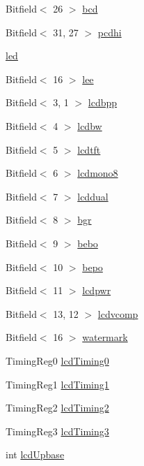 \begin{DoxyCompactItemize}
\item 
Bitfield$<$ 26 $>$ \hyperlink{classPl111_a0187bf822dcc45b134574fc55eed6eb1}{bcd}
\item 
Bitfield$<$ 31, 27 $>$ \hyperlink{classPl111_a2c2dac95ed9aeb35e4a37ebdafc357e2}{pcdhi}
\item 
\hyperlink{classPl111_a9109701c3de11ac33b79bf6ff097c638}{led}
\item 
Bitfield$<$ 16 $>$ \hyperlink{classPl111_a0e01cda43f9c69085148429c5290bbf3}{lee}
\item 
Bitfield$<$ 3, 1 $>$ \hyperlink{classPl111_abd7707fa3d87acffedc6f4c9209c7c79}{lcdbpp}
\item 
Bitfield$<$ 4 $>$ \hyperlink{classPl111_a4bb5bb1498d8e3732da8289f112ff999}{lcdbw}
\item 
Bitfield$<$ 5 $>$ \hyperlink{classPl111_a5fd2ed83172b7ffc81125a20b85168fe}{lcdtft}
\item 
Bitfield$<$ 6 $>$ \hyperlink{classPl111_a6e4fb7a990dd12fac2111fcddc777293}{lcdmono8}
\item 
Bitfield$<$ 7 $>$ \hyperlink{classPl111_a32eb960c1f79fd957f27e3b0b22448dc}{lcddual}
\item 
Bitfield$<$ 8 $>$ \hyperlink{classPl111_ae80ace152cc12bf133df88071c32d698}{bgr}
\item 
Bitfield$<$ 9 $>$ \hyperlink{classPl111_af9df5bc47741af129f092ed0ab995f68}{bebo}
\item 
Bitfield$<$ 10 $>$ \hyperlink{classPl111_a8f830e5676f3e5df556288700620fefd}{bepo}
\item 
Bitfield$<$ 11 $>$ \hyperlink{classPl111_a3e0d21d15a72646c76bb73983fb1ba0c}{lcdpwr}
\item 
Bitfield$<$ 13, 12 $>$ \hyperlink{classPl111_a2a0a19c8b8c96df46fb76554de82dd7f}{lcdvcomp}
\item 
Bitfield$<$ 16 $>$ \hyperlink{classPl111_a7abe404e6aebfe792ff7ed7a28f74eae}{watermark}
\item 
TimingReg0 \hyperlink{classPl111_a913cd36ff92062c47b446b69308ddc56}{lcdTiming0}
\item 
TimingReg1 \hyperlink{classPl111_a0d40494e71744c6ea4d0f71361a79716}{lcdTiming1}
\item 
TimingReg2 \hyperlink{classPl111_a2f98cbb0ab28ad2c919d0e4f9287cb20}{lcdTiming2}
\item 
TimingReg3 \hyperlink{classPl111_a731c4b1e7fbe0aaf8b9f98989beda1c4}{lcdTiming3}
\item 
int \hyperlink{classPl111_aef3cf09646b914943e589e68e3edd88b}{lcdUpbase}
\item 

\end{DoxyCompactItemize}
